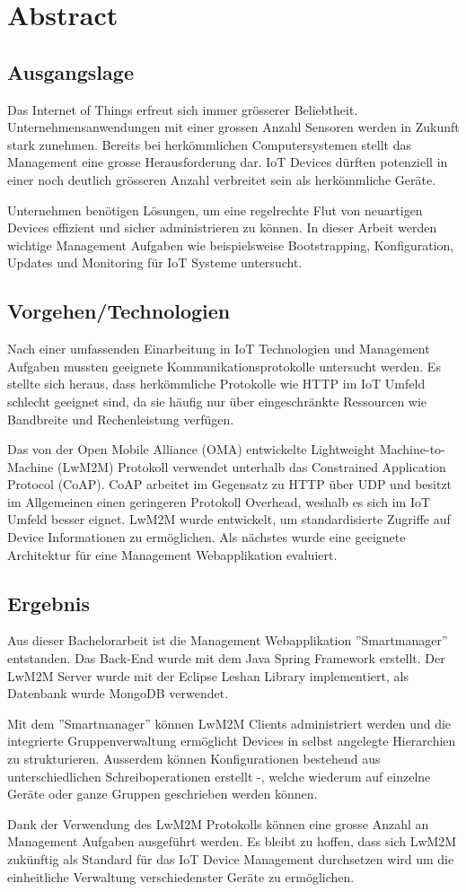 \chapter*{Abstract}
\section*{Ausgangslage}
Das Internet of Things erfreut sich immer grösserer Beliebtheit. Unternehmensanwendungen mit einer grossen Anzahl Sensoren werden in Zukunft stark zunehmen. Bereits bei herkömmlichen Computersystemen stellt das Management eine grosse Herausforderung dar. IoT Devices dürften potenziell in einer noch deutlich grösseren Anzahl verbreitet sein als herkömmliche Geräte. 

Unternehmen benötigen Lösungen, um eine regelrechte Flut von neuartigen Devices effizient und sicher administrieren zu können. In dieser Arbeit werden wichtige Management Aufgaben wie beispielsweise Bootstrapping, Konfiguration, Updates und Monitoring für IoT Systeme untersucht.
\section*{Vorgehen/Technologien}
Nach einer umfassenden Einarbeitung in IoT Technologien und Management Aufgaben mussten geeignete Kommunikationsprotokolle untersucht werden. Es stellte sich heraus, dass herkömmliche Protokolle wie HTTP im IoT Umfeld schlecht geeignet sind, da sie häufig nur über eingeschränkte Ressourcen wie Bandbreite und Rechenleistung verfügen. 

Das von der Open Mobile Alliance (OMA) entwickelte Lightweight Machine-to-Machine (LwM2M) Protokoll verwendet unterhalb das Constrained Application Protocol (CoAP). CoAP arbeitet im Gegensatz zu HTTP über UDP und besitzt im Allgemeinen einen geringeren Protokoll Overhead, weshalb es sich im IoT Umfeld besser eignet. LwM2M wurde entwickelt, um standardisierte Zugriffe auf Device Informationen zu ermöglichen. Als nächstes wurde eine geeignete Architektur für eine Management Webapplikation evaluiert.
\section*{Ergebnis}
Aus dieser Bachelorarbeit ist die Management Webapplikation ''Smartmanager'' entstanden. Das Back-End wurde mit dem Java Spring Framework erstellt. Der LwM2M Server wurde mit der Eclipse Leshan Library implementiert, als Datenbank wurde MongoDB verwendet. 

Mit dem ''Smartmanager'' können LwM2M Clients administriert werden und die integrierte Gruppenverwaltung ermöglicht Devices in selbst angelegte Hierarchien zu strukturieren. Ausserdem können Konfigurationen bestehend aus unterschiedlichen Schreiboperationen erstellt -, welche wiederum auf einzelne Geräte oder ganze Gruppen geschrieben werden können. 

Dank der Verwendung des LwM2M Protokolls können eine grosse Anzahl an Management Aufgaben ausgeführt werden. Es bleibt zu hoffen, dass sich LwM2M zukünftig als Standard für das IoT Device Management durchsetzen wird um die einheitliche Verwaltung verschiedenster Geräte zu ermöglichen.
